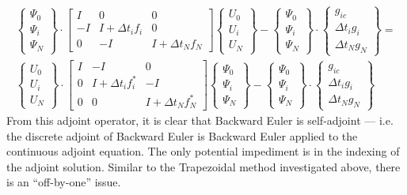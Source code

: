 \documentclass[10pt]{article}
\begin{document}
\begin{eqnarray}
\left\{\begin{array}{c} \Psi_0 \\ \Psi_i \\\Psi_N \end{array}\right\}
\cdot
\left[\begin{array}{ccc} 
I & 0 & 0 \\
-I & I + \Delta t_i f_i & 0 \\
0 & -I & I + \Delta t_N f_N
\end{array}\right] 
\left\{\begin{array}{c} U_0 \\ U_i \\ U_N \end{array} \right\} -
\left\{\begin{array}{c} \Psi_0 \\ \Psi_i \\\Psi_N \end{array}\right\}
\cdot
\left\{\begin{array}{c} 
g_{ic} \\ \Delta t_i g_i \\ \Delta t_N g_N \end{array} \right\} =
\nonumber \\
\left\{\begin{array}{c} U_0 \\ U_i \\ U_N \end{array}\right\}
\cdot
\left[ \begin{array}{ccc} 
I & -I & 0 \\
0 & I + \Delta t_i f^*_i & -I \\
0 &  0 & I + \Delta t_N f^*_N
\end{array} \right] 
\left\{\begin{array}{c} \Psi_0 \\ \Psi_i \\ \Psi_N \end{array} \right\} - 
\left\{\begin{array}{c} \Psi_0 \\ \Psi_i \\\Psi_N \end{array}\right\}
\cdot
\left\{\begin{array}{c} g_{ic} \\ \Delta t_i g_i \\ \Delta t_N g_N
\end{array} \right\}
\end{eqnarray}
From this adjoint operator, it is clear that Backward Euler is self-adjoint
--- i.e. the discrete adjoint of Backward Euler is Backward Euler applied to
the continuous adjoint equation.  The only potential impediment is in the
indexing of the adjoint solution. Similar to the Trapezoidal method
investigated above, there is an ``off-by-one'' issue.
\end{document}

